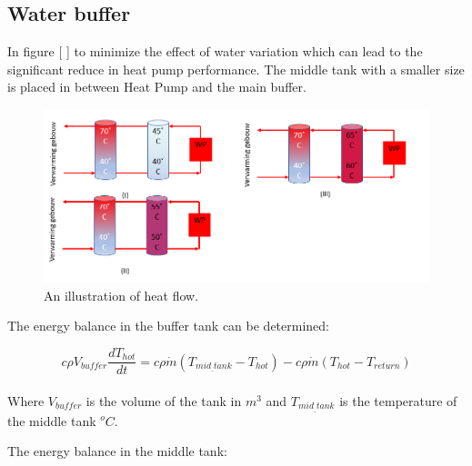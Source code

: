 \documentclass[a4paper,10pt]{article}
\begin{document}
\subsection{Water buffer}

In figure [ ] to minimize the effect of water variation which can lead to the significant reduce in heat pump performance. The middle tank with a smaller size is placed in between Heat Pump and the main buffer.  

\begin{figure}[H]
\centering
\includegraphics[width=1\columnwidth]{pictures/middle_tank.png}
\caption[Short title]{An illustration of heat flow.}
\label{fig:ff6}\end{figure}

The energy balance in the buffer tank can be determined:

\begin{equation}
c\rho V_{buffer}\frac{dT_{hot}}{dt}= c\rho \Dot{m}(T_{mid_{\_}tank}-T_{hot}) - c\rho \Dot{m}(T_{hot}-T_{return})
\end{equation}
\\
Where $V_{buffer}$ is the volume of the tank in $m^3$ and $T_{mid_{\_}tank}$ is the temperature of the middle tank $^oC$.

The energy balance in the middle tank:


\end{document}
